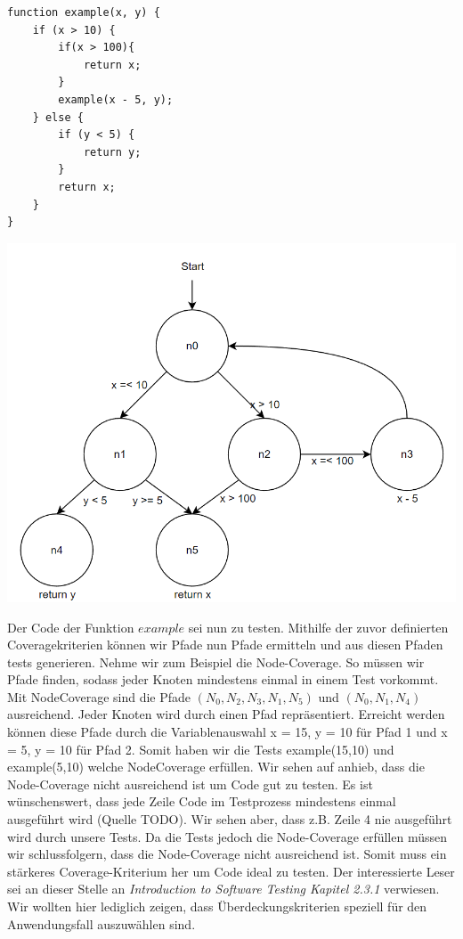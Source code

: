 \begin{minipage}{.5\linewidth}
    \begin{lstlisting}
function example(x, y) {
    if (x > 10) {
        if(x > 100){
            return x;
        }
        example(x - 5, y);
    } else {
        if (y < 5) {
            return y;
        }
        return x;
    }
}
    \end{lstlisting}

\end{minipage}%
\begin{minipage}{.5\linewidth}
    \begin{center}
        \includegraphics[width=\textwidth,height=\textheight,keepaspectratio]{img/cfg}
    \end{center}
\end{minipage}

Der Code der Funktion $example$ sei nun zu testen.
Mithilfe der zuvor definierten Coveragekriterien können wir Pfade nun Pfade ermitteln und aus diesen Pfaden tests generieren.
Nehme wir zum Beispiel die Node-Coverage.
So müssen wir Pfade finden, sodass jeder Knoten mindestens einmal in einem Test vorkommt.
Mit NodeCoverage sind die Pfade $(N_0, N_2, N_3, N_1, N_5)$ und $(N_0, N_1, N_4)$ ausreichend.
Jeder Knoten wird durch einen Pfad repräsentiert.
Erreicht werden können diese Pfade durch die Variablenauswahl x = 15, y = 10 für Pfad 1 und x = 5, y = 10 für Pfad 2.
Somit haben wir die Tests example(15,10) und example(5,10) welche NodeCoverage erfüllen.
Wir sehen auf anhieb, dass die Node-Coverage nicht ausreichend ist um Code gut zu testen.
Es ist wünschenswert, dass jede Zeile Code im Testprozess mindestens einmal ausgeführt wird (Quelle TODO).
Wir sehen aber, dass z.B. Zeile 4 nie ausgeführt wird durch unsere Tests.
Da die Tests jedoch die Node-Coverage erfüllen müssen wir schlussfolgern, dass die Node-Coverage nicht ausreichend ist.
Somit muss ein stärkeres Coverage-Kriterium her um Code ideal zu testen.
Der interessierte Leser sei an dieser Stelle an \textit{Introduction to Software Testing Kapitel 2.3.1} \cite{software-testing} verwiesen.
Wir wollten hier lediglich zeigen, dass Überdeckungskriterien speziell für den Anwendungsfall auszuwählen sind.
